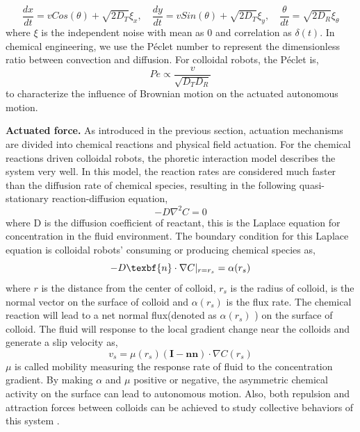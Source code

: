 \begin{equation}
    \frac{dx}{dt}=v Cos(\theta)+\sqrt{2 D_T}\xi_x, \quad \frac{dy}{dt}=v Sin(\theta)+\sqrt{2 D_T}\xi_y,\quad
    \frac{\theta}{dt}=\sqrt{2 D_R}\xi_\theta
\end{equation}
where $\xi$ is the independent noise with mean as $0$ and correlation as $\delta(t)$. In chemical engineering, we use the Péclet number to represent the dimensionless ratio between convection  and diffusion. For colloidal robots, the Péclet is, 
\begin{equation}
    Pe\propto\frac{v}{\sqrt{D_T D_R}}
\end{equation}
to characterize the influence of Brownian motion on the actuated autonomous motion.

\textbf{Actuated force.} As introduced in the previous section, actuation mechanisms are divided into chemical reactions and physical field actuation. For the chemical reactions driven colloidal robots, the phoretic interaction  model describes the system very well\autocite{golestanian2007,najafi2004simple,golestanian2005propulsion,golestanian2019phoretic}. In this model, the reaction rates are considered much faster than the diffusion rate of chemical species, resulting in the following   
quasi-stationary reaction-diffusion equation,
\begin{equation}
    -D\nabla^2 C=0
\end{equation}
where D is the diffusion coefficient of reactant, this is the Laplace equation for concentration in the fluid environment. The boundary condition for this Laplace equation is  colloidal robots' consuming or producing chemical species as,
\begin{equation}
    -D \texbf{n}\cdot \nabla C|_{r=r_s}=\alpha(r_s)
\end{equation}
where $r$ is the distance from the center of colloid, $r_s$ is the radius of colloid,  is the normal vector on the surface of colloid and $\alpha(r_s)$ is the flux rate. The chemical reaction will lead to a net normal flux(denoted as $\alpha(r_s)$ ) on the surface of colloid. The fluid will response to the local gradient change near the colloids and generate a slip velocity as,
\begin{equation}
    v_s=\mu(r_s)(\textbf{I}-\textbf{n}\textbf{n})\cdot \nabla C(r_s)
\end{equation}
$\mu$ is called mobility measuring the response rate of fluid to the concentration gradient. By making $\alpha$ and $\mu$ positive or negative, the asymmetric chemical activity on the surface can lead to autonomous motion.  Also, both repulsion and attraction forces between colloids can be achieved to study collective behaviors of this system     \autocite{michelin2015autophoretic}.

